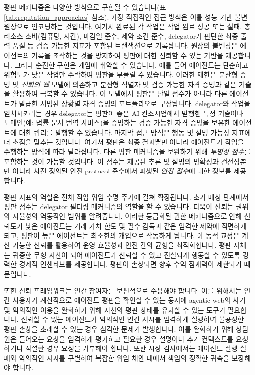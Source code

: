 \documentclass[11pt, a4paper, twocolumn, copyright, goog]{google}
\begin{document}
평판 메커니즘은 다양한 방식으로 구현될 수 있습니다(표 \ref{tab:reputation_approaches} 참조). 가장 직접적인 접근 방식은 이를 성능 기반 불변 원장으로 인코딩하는 것입니다. 여기서 완료된 각 작업은 작업 완료 성공 또는 실패, 총 리소스 소비(컴퓨팅, 시간), 마감일 준수, 제약 조건 준수, delegator가 판단한 최종 출력 품질 등 검증 가능한 지표가 포함된 트랜잭션으로 기록됩니다. 원장의 불변성은 에이전트의 기록을 조작하는 것을 방지하여 평판에 대한 신뢰할 수 있는 기반을 제공합니다. 그러나 순진한 구현은 게임에 취약할 수 있습니다. 예를 들어 에이전트는 단순하고 위험도가 낮은 작업만 수락하여 평판을 부풀릴 수 있습니다. 이러한 제한은 분산형 증명 및 \emph{신뢰의 웹} 모델에 의존하고 분산형 식별자 및 검증 가능한 자격 증명과 같은 기술을 활용하여 극복할 수 있습니다. 이 모델에서 평판은 단일 점수가 아니라 다른 에이전트가 발급한 서명된 상황별 자격 증명의 포트폴리오로 구상됩니다. delegator와 작업을 일치시키려는 경우 delegator는 평판이 좋은 AI 컨소시엄에서 발행한 특정 기술이나 도메인(예: 법률 문서 번역 서비스)을 증명하는 검증 가능한 자격 증명을 보유한 에이전트에 대한 쿼리를 발행할 수 있습니다. 마지막 접근 방식은 행동 및 설명 가능성 지표에 더 초점을 맞추는 것입니다. 여기서 평판은 최종 결과뿐만 아니라 에이전트가 작업을 수행하는 방식에 따라 달라집니다. 다른 평판 메커니즘을 보완하기 위해 \emph{투명성 점수}를 포함하는 것이 가능할 것입니다. 이 점수는 제공된 추론 및 설명의 명확성과 건전성뿐만 아니라 사전 정의된 안전 protocol 준수에서 파생된 \emph{안전 점수}에 대한 정보를 제공합니다.

평판 지표의 역할은 전체 작업 위임 수명 주기에 걸쳐 확장됩니다. 초기 매칭 단계에서 평판 점수는 delegator 필터링 메커니즘의 역할을 할 수 있습니다. 더욱이 신뢰는 권위와 자율성의 역동적인 범위를 알려줍니다. 이러한 등급화된 권한 메커니즘으로 인해 신뢰도가 낮은 에이전트는 거래 가치 한도 및 필수 감독과 같은 엄격한 제약에 직면하게 되고, 평판이 높은 에이전트는 최소한의 개입으로 작동하게 됩니다. 이 동적 교정은 계산 가능한 신뢰를 활용하여 운영 효율성과 안전 간의 균형을 최적화합니다. 평판 자체는 귀중한 무형 자산이 되어 에이전트가 신뢰할 수 있고 진실되게 행동할 수 있도록 강력한 경제적 인센티브를 제공합니다. 평판이 손상되면 향후 수익 잠재력이 제한되기 때문입니다.

또한 신뢰 프레임워크는 인간 참여자를 보편적으로 수용해야 합니다. 이를 위해서는 인간 사용자가 계산적으로 에이전트 평판을 확인할 수 있는 동시에 agentic web의 사기 및 악의적인 이용을 완화하기 위해 자신의 평판 상태를 유지할 수 있는 도구가 필요합니다. 신뢰할 수 있는 에이전트가 악의적인 인간 지시를 엄격하게 실행하여 불공정한 평판 손상을 초래할 수 있는 경우 심각한 문제가 발생합니다. 이를 완화하기 위해 상담원은 들어오는 요청을 엄격하게 평가하고 필요한 경우 설명이나 추가 컨텍스트를 요청하거나 적절한 경우 요청을 거부해야 합니다. 또한 시장 감사에서는 에이전트 실행 실패와 악의적인 지시를 구별하여 복잡한 위임 체인 내에서 책임의 정확한 귀속을 보장해야 합니다.
\end{document}
